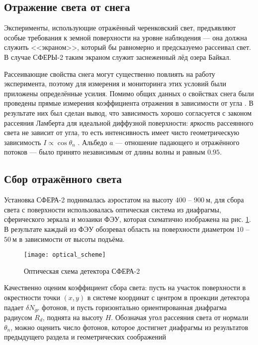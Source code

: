 \subsection{Отражение света от снега}
\label{sect:snow-reflection}

Эксперименты, использующие отражённый черенковский свет, предъявляют особые требования к земной поверхности на уровне наблюдения --- она должна служить <<экраном>>, который бы равномерно и предсказуемо рассеивал свет. В случае СФЕРЫ-2 таким экраном служит заснеженный лёд озера Байкал.

Рассеивающие свойства снега могут существенно повлиять на работу эксперимента, поэтому для измерения и мониторинга этих условий были приложены определённые усилия. Помимо общих данных о свойствах снега \cite{Warren1982} были проведены прямые измерения коэффициента отражения в зависимости от угла \cite[рис.~11]{Sphere2015}. В результате них был сделан вывод, что зависимость хорошо согласуется с законом рассеяния Ламберта для идеальной диффузной поверхности: \textit{яркость} рассеянного света не зависит от угла, то есть интенсивность имеет чисто геометрическую зависимость $I \propto \cos \theta_n$ \cite{Antonov2019}. Альбедо $a$ --- отношение падающего и отражённого потоков --- было принято независимым от длины волны и равным $0.95$.

\subsection{Сбор отражённого света}
\label{sec:light-collection-from-surface}

Установка СФЕРА-2 поднималась аэростатом на высоту $400$ -- $900~\text{м}$, для сбора света с поверхности использовалась оптическая система из диафрагмы, сферического зеркала и мозаики ФЭУ, которая схематично изображена на рис. \ref{pic:sphere-detector-optical-scheme}. В результате каждый из ФЭУ обозревал область на поверхности диаметром $10$ -- $50~\text{м}$ в зависимости от высоты подъёма.

\begin{figure}
	\centering
	\texttt{[image: optical\_scheme]}
	\caption{Оптическая схема детектора СФЕРА-2}
	\label{pic:sphere-detector-optical-scheme}
\end{figure}

Качественно оценим коэффициент сбора света: пусть на участок поверхности в окрестности точки $(x, y)$ в системе координат с центром в проекции детектора падает $\delta N_{gr}$ фотонов, и пусть горизонтально ориентированная диафрагма радиусом $R_{d}$, поднята на высоту $H$. Обозначая угол рассеяния света от нормали $\theta_n$, можно оценить число фотонов, которое достигнет диафрагмы из результатов предыдущего раздела и геометрических соображений

